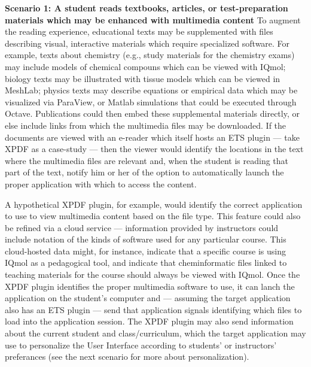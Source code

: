 \documentclass[10pt,letterpaper]{article}
\newcommand{\pseudoIndent}{

\vspace{10pt}\hspace*{38pt}}
\newcommand{\GRE}{\resizebox{!}{8.5pt}{\AcronymText{GRE}}}
\newcommand{\ThreeD}{\resizebox{!}{8pt}{\AcronymText{3D}}}
\newcommand{\textscc}[1]{{\color{orr!35!black}{{%
						\fontfamily{Cabin-TLF}\fontseries{b}\selectfont{\textsc{\scriptsize{#1}}}}}}}
\newcommand{\AcronymText}[1]{{\textscc{#1}}}
\newenvironment{mldescription}{%
  \begin{addmargin}[4pt]{1em}
    \setlength{\parindent}{-1em}%
    \newcommand*{\mlitem}[1][]{\vspace{20pt}\par\medskip\textbf{##1}\quad}\indent
}{%
  \end{addmargin}
  \medskip
}
\begin{document}
{{\begin{mldescription}%
\mlitem[%
Scenario 1: A student reads textbooks, articles, 
or test-preparation materials which may be enhanced 
with multimedia content%
]  To augment the reading 
experience, educational texts may be supplemented 
with files describing visual, interactive materials 
which require specialized software.  For example, 
texts about chemistry (e.g., study materials for 
the chemistry \GRE{} exams) may include \ThreeD{} 
models of chemical compouns which can be viewed 
with IQmol; biology texts may be illustrated 
with \ThreeD{} tissue models which can be viewed 
in MeshLab; physics texts may describe 
equations or empirical data which may be visualized 
via ParaView, or Matlab simulations that could be 
executed through Octave.  Publications could then 
embed these supplemental 
materials directly, or else include links from which 
the multimedia files may be downloaded.  If the 
documents are viewed with an e-reader which itself 
hosts an ETS plugin --- take XPDF as a case-study --- 
then the viewer would identify the locations in the 
text where the multimedia files are relevant and, 
when the student is reading that part of the text, 
notify him or her of the option to automatically 
launch the proper application with which to access the content.

\pseudoIndent{} A hypothetical XPDF plugin, for example, 
would identify the correct application to use to view 
multimedia content based on the file type.  This feature 
could also be refined via a cloud service --- information 
provided by instructors could include notation of the 
kinds of software used for any particular course.  
This cloud-hosted data might, for instance, indicate 
that a specific course is using IQmol as a pedagogical 
tool, and indicate that cheminformatic files linked 
to teaching materials for the course should always be 
viewed with IQmol.  Once the XPDF plugin identifies 
the proper multimedia software to use, it can 
lanch the application on the student's computer and 
--- assuming the target application also has an ETS 
plugin --- send that application signals identifying 
which files to load into the application session.   
The XPDF plugin may also send 
information about the current student and 
class/curriculum, which the target application may use to 
personalize the User Interface according to students' 
or instructors' preferances (see the next scenario 
for more about personalization).


\end{mldescription}}}
\end{document}
